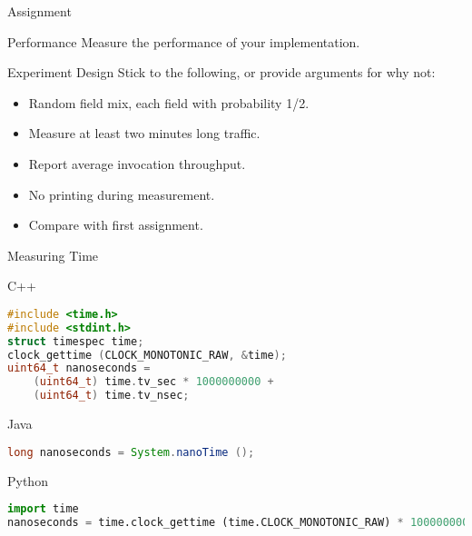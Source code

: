 \begin{frame}{Assignment}
    \begin{block}{Performance}
        Measure the performance of your implementation.
    \end{block}

    \bigskip

    \begin{block}{Experiment Design}
        Stick to the following, or provide arguments for why not:
        \begin{itemize}
            \item Random field mix, each field with probability 1/2.
            \item Measure at least two minutes long traffic.
            \item Report average invocation throughput.
            \item No printing during measurement.
            \item Compare with first assignment.
        \end{itemize}
    \end{block}
\end{frame}


\begin{frame}[fragile]{Measuring Time}
    \begin{block}{C++}
\begin{lstlisting}[language=c,style=mini]
#include <time.h>
#include <stdint.h>
struct timespec time;
clock_gettime (CLOCK_MONOTONIC_RAW, &time);
uint64_t nanoseconds =
    (uint64_t) time.tv_sec * 1000000000 +
    (uint64_t) time.tv_nsec;
\end{lstlisting}
    \end{block}
    \begin{block}{Java}
\begin{lstlisting}[language=java,style=mini]
long nanoseconds = System.nanoTime ();
\end{lstlisting}
    \end{block}
    \begin{block}{Python}
\begin{lstlisting}[language=python,style=mini]
import time
nanoseconds = time.clock_gettime (time.CLOCK_MONOTONIC_RAW) * 1000000000
\end{lstlisting}
    \end{block}
\end{frame}
